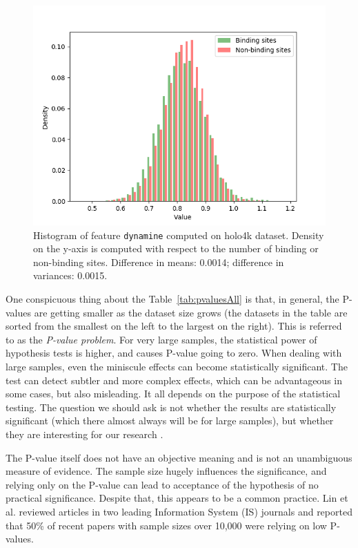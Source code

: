 \begin{figure}[!htbp]\centering
\includegraphics[width=120mm]{../img/dynamine_hist.png}
\caption{Histogram of feature \texttt{dynamine} computed on holo4k dataset. Density on the y-axis is computed with respect to the number of binding or non-binding sites. Difference in means: 0.0014; difference in variances: 0.0015.}
\label{fig:dynamine}
\end{figure}

One conspicuous thing about the Table~\ref{tab:pvaluesAll} is that, in general, the P-values are getting smaller as the dataset size grows (the datasets in the table are sorted from the smallest on the left to the largest on the right). This is referred to as the \textit{P-value problem}. For very large samples, the statistical power of hypothesis tests is higher, and causes P-value going to zero. When dealing with large samples, even the miniscule effects can become statistically significant. The test can detect subtler and more complex effects, which can be advantageous in some cases, but also misleading. It all depends on the purpose of the statistical testing. The question we should ask is not whether the results are statistically significant (which there almost always will be for large samples), but whether they are interesting for our research \cite{pvalueproblem}.

The P-value itself does not have an objective meaning and is not an unambiguous measure of evidence. The sample size hugely influences the significance, and relying only on the P-value can lead to acceptance of the hypothesis of no practical significance. Despite that, this appears to be a common practice. Lin et al. \cite{pvalueproblem} reviewed articles in two leading Information System (IS) journals and reported that 50\% of recent papers with sample sizes over 10,000 were relying on low P-values.

